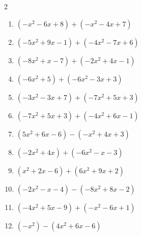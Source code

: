 \begin{multicols}{2}
\begin{enumerate}
  \item $(-x^{2}-6x+8)+(-x^{2}-4x+7)$


  \item $(-5x^{2}+9x-1)+(-4x^{2}-7x+6)$


  \item $(-8x^{2}+x-7)+(-2x^{2}+4x-1)$


  \item $(-6x^{2}+5)+(-6x^{2}-3x+3)$


  \item $(-3x^{2}-3x+7)+(-7x^{2}+5x+3)$


  \item $(-7x^{2}+5x+3)+(-4x^{2}+6x-1)$


  \item $(5x^{2}+6x-6)-(-x^{2}+4x+3)$


  \item $(-2x^{2}+4x)+(-6x^{2}-x-3)$


  \item $(x^{2}+2x-6)+(6x^{2}+9x+2)$


  \item $(-2x^{2}-x-4)-(-8x^{2}+8x-2)$


  \item $(-4x^{2}+5x-9)+(-x^{2}-6x+1)$


  \item $(-x^{2})-(4x^{2}+6x-6)$


\end{enumerate}
\end{multicols}

\newpage
\resetdrill

